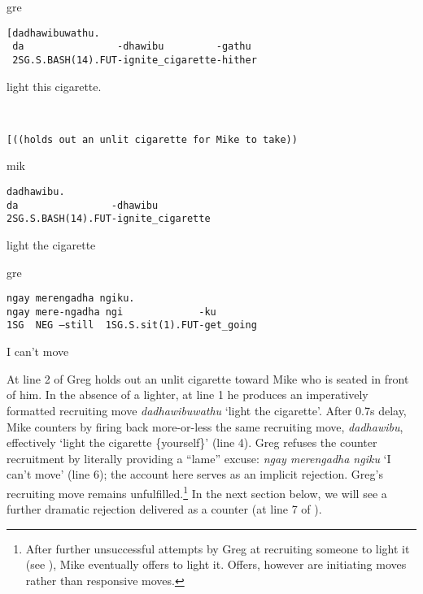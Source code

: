 \documentclass[output=paper,nonflat,colorlinks,citecolor=brown]{langsci/langscibook}
\begin{document}
\vspace{-1mm}
%
\begin{mdframednoverticalspace}[style=firstfoc]
\begin{transbox}{1}{gre}
\begin{verbatim}
[dadhawibuwathu.
 da                -dhawibu         -gathu
 2SG.S.BASH(14).FUT-ignite_cigarette-hither
\end{verbatim}
\hspace{0.07cm} light this cigarette.
\end{transbox}
\end{mdframednoverticalspace}
\begin{mdframednoverticalspace}[style=firstfoc]
\begin{transbox}{2}{~}
\begin{verbatim}
[((holds out an unlit cigarette for Mike to take))
\end{verbatim}
\end{transbox}
\end{mdframednoverticalspace}
%
%
\begin{mdframednoverticalspace}[style=thirdfoc]
\begin{transbox}{4}{mik}
\begin{verbatim}
dadhawibu.
da                -dhawibu
2SG.S.BASH(14).FUT-ignite_cigarette
\end{verbatim}
light the cigarette
\end{transbox}
\end{mdframednoverticalspace}
%
\begin{mdframednoverticalspace}[style=secondfoc]
\begin{transbox}{6}{gre}
\begin{verbatim}
ngay merengadha ngiku.
ngay mere-ngadha ngi             -ku
1SG  NEG –still  1SG.S.sit(1).FUT-get_going
\end{verbatim}
I can't move
\end{transbox}
\end{mdframednoverticalspace}\bigskip

At line 2 of  Greg holds out an unlit cigarette toward Mike who is seated in front of him. In the absence of a lighter, at line 1 he produces an imperatively formatted recruiting move \textit{dadhawibuwathu} ‘light the cigarette’. After 0.7s delay, Mike counters by firing back more-or-less the same recruiting move, \textit{dadhawibu}, effectively ‘light the cigarette \{yourself\}’ (line 4). Greg refuses the counter recruitment by literally providing a “lame” excuse: \textit{ngay merengadha ngiku} ‘I can’t move’ (line 6); the account here serves as an implicit rejection. Greg’s recruiting move remains unfulfilled.\footnote{After further unsuccessful attempts by Greg at recruiting someone to light it (see ), Mike eventually offers to light it. Offers, however are initiating moves rather than responsive moves.} In the next section below, we will see a further dramatic rejection delivered as a counter (at line 7 of ).
\end{document}
